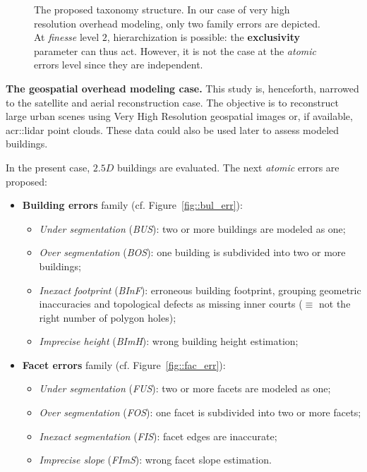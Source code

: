 \documentclass[runningheads]{llncs}
\begin{document}
	\begin{figure}
        \begin{center}
            
            \vspace{-1.1cm}
            \caption{\label{fig::taxonomy} The proposed taxonomy structure. In our case of very high resolution overhead modeling, only two family errors are depicted. At \textit{finesse} level $2$, hierarchization is possible: the \textbf{exclusivity} parameter can thus act. However, it is not the case at the \textit{atomic} errors level since they are independent. }
        \end{center}
    \end{figure}
\noindent
\textbf{The geospatial overhead modeling case.}
This study is, henceforth, narrowed to the satellite and aerial reconstruction case. The objective is to reconstruct large urban scenes using Very High Resolution geospatial images or, if available, \acrshort{acr::lidar} point clouds. These data could also be used later to assess modeled buildings.

In the present case, $2.5D$ buildings are evaluated. The next \textit{atomic} errors are proposed:
	\begin{itemize}
		\item \textbf{Building errors} family (cf. Figure~\ref{fig::bul_err}):
        \begin{itemize}
        	\item \textit{Under segmentation} (\textit{BUS}): two or more buildings are modeled as one;
            \item \textit{Over segmentation} (\textit{BOS}): one building is subdivided into two or more buildings;
            \item \textit{Inexact footprint} (\textit{BInF}): erroneous building footprint, grouping geometric inaccuracies and topological defects as missing inner courts ($\equiv$ not the right number of polygon holes);
            \item \textit{Imprecise height} (\textit{BImH}): wrong building height estimation;
        \end{itemize}
		\item \textbf{Facet errors} family (cf. Figure~\ref{fig::fac_err}):
        \begin{itemize}
        	\item \textit{Under segmentation} (\textit{FUS}): two or more facets are modeled as one;
            \item \textit{Over segmentation} (\textit{FOS}): one facet is subdivided into two or more facets;
            \item \textit{Inexact segmentation} (\textit{FIS}): facet edges are inaccurate;
            \item \textit{Imprecise slope} (\textit{FImS}): wrong facet slope estimation.
        \end{itemize}
	\end{itemize}
\end{document}
